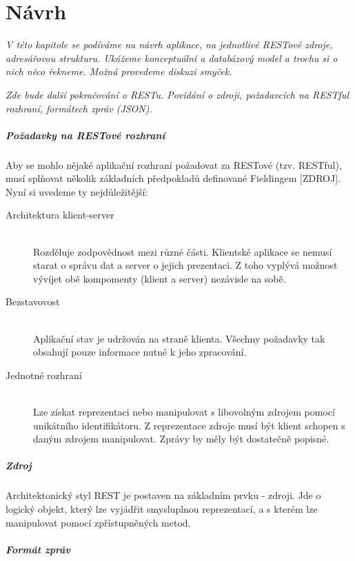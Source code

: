 \chapter{Návrh}

\textit{V této kapitole se podíváme na návrh aplikace, na jednotlivé RESTové zdroje,
adresářovou strukturu. Ukážeme konceptuální a databázový model a trochu si o nich něco řekneme.
Možná provedeme diskuzi smyček.}


\textit{Zde bude další pokračování o RESTu. Povídání o zdroji, požadavcích na RESTful rozhraní, formátech zpráv (JSON).}


\paragraph{Požadavky na RESTové rozhraní}

Aby se mohlo nějaké aplikační rozhraní požadovat za RESTové (tzv. RESTful),
musí splňovat několik základních předpokladů definované Fieldingem [ZDROJ].
Nyní si uvedeme ty nejdůležitější:

\begin{description}
    \item[Architektura klient-server] \hfill \\
    Rozděluje zodpovědnost mezi různé části. Klientské aplikace se nemusí starat o správu dat a server o jejich prezentaci.
    Z toho vyplývá možnost vývíjet obě kompomenty (klient a server) nezávisle na sobě.
    \item[Bezstavovost] \hfill \\
    Aplikační stav je udržován na straně klienta. Všechny požadavky tak obsahují pouze informace nutné k jeho zpracování.  
    \item[Jednotné rozhraní] \hfill \\
    Lze získat reprezentaci nebo manipulovat s libovolným zdrojem pomocí unikátního identifikátoru.
    Z reprezentace zdroje musí být klient schopen s daným zdrojem manipulovat. Zprávy by měly být dostatečně popisné.
\end{description}
 
\paragraph{Zdroj}

Architektonický styl REST je postaven na základním prvku - zdroji. Jde o logický objekt,
který lze vyjádřit smysluplnou reprezentací, a s kterém lze manipulovat pomocí zpřístupněných metod.


\paragraph{Formát zpráv}